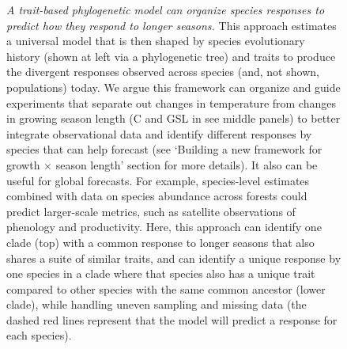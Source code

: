 \documentclass[11pt]{article}
\begin{document}
\clearpage
\begin{figure}[h!]
\caption{\emph{A trait-based phylogenetic model can organize species responses to predict how they respond to longer seasons.} This approach estimates a universal model that is then shaped by species evolutionary history (shown at left via a phylogenetic tree) and traits to produce the divergent responses observed across species (and, not shown, populations) today. We argue this framework can organize and guide experiments that separate out changes in temperature from changes in growing season length (\degree C and GSL in see middle panels) to better integrate observational data and identify different responses by species that can help forecast (see `Building a new framework for growth $\times$ season length' section for more details). It also can be useful for global forecasts. For example, species-level estimates combined with data on species abundance across forests \citep[e.g.][]{FIA,fischer2019swiss} could predict larger-scale metrics, such as satellite observations of phenology and productivity. Here, this approach can identify one clade (top) with a common response to longer seasons that also shares a suite of similar traits, and can identify a unique response by one species in a clade where that species also has a unique trait compared to other species with the same common ancestor (lower clade), while handling uneven sampling and missing data (the dashed red lines represent that the model will predict a response for each species). }  
\end{figure}
\end{document}

